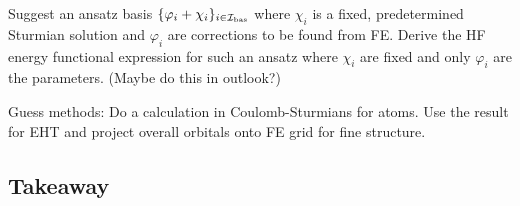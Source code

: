 Suggest an ansatz basis $\{\varphi_i + \chi_i\}_{i\in\mathcal{I}_\text{bas}}$
where $\chi_i$ is a fixed, predetermined Sturmian solution
and $\varphi_i$ are corrections to be found from FE.
Derive the HF energy functional expression for such an ansatz
where $\chi_i$ are fixed and only $\varphi_i$ are the parameters.
(Maybe do this in outlook?)




Guess methods:
Do a calculation in Coulomb-Sturmians for atoms.
Use the result for EHT and project overall orbitals onto FE grid
for fine structure.


\subsection{Takeaway}
